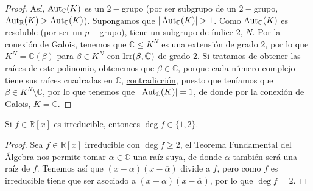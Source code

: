 \begin{teo}
\begin{proof}
        \noindent
        Así, $\operatorname{Aut}_\mathbb{C}(K)$ es un $2-$grupo (por ser subgrupo de un $2-$grupo, $\operatorname{Aut}_\mathbb{R}(K)>\operatorname{Aut}_\mathbb{C}(K)$). Supongamos que $|\Aut_\mathbb{C}(K)|>1$. Como $\operatorname{Aut}_\mathbb{C}(K)$ es resoluble (por ser un $p-$grupo), tiene un subgrupo de índice $2$, $N$. Por la conexión de Galois, tenemos que $\mathbb{C}\leq K^N$ es una extensión de grado 2, por lo que $K^N = \mathbb{C}(\beta)$ para $\beta\in K^N$ con $\operatorname{Irr}(\beta,\mathbb{C})$ de grado 2. Si tratamos de obtener las raíces de este polinomio, obtenemos que $\beta\in \mathbb{C}$, porque cada número complejo tiene sus raíces cuadradas en $\mathbb{C}$, \underline{contradicción}, puesto que teníamos que $\beta\in K^N\setminus \mathbb{C}$, por lo que tenemos que $|\operatorname{Aut}_\mathbb{C}(K)| = 1$, de donde por la conexión de Galois, $K = \mathbb{C}$.
    \end{proof}
\end{teo}

\begin{coro}
    Si $f\in \mathbb{R}[x]$ es irreducible, entonces $\deg f \in \{1,2\}$.
    \begin{proof}
        Sea $f\in \mathbb{R}[x]$ irreducible con $\deg f\geq 2$, el Teorema Fundamental del Álgebra nos permite tomar $\alpha\in \mathbb{C}$ una raíz suya, de donde $\overline{\alpha}$ también será una raíz de $f$. Tenemos así que $(x-\alpha)(x-\overline{\alpha})$ divide a $f$, pero como $f$ es irreducible tiene que ser asociado a $(x-\alpha)(x-\overline{\alpha})$, por lo que $\deg f = 2$.
    \end{proof}
\end{coro}


